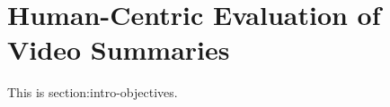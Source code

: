 \section{Human-Centric Evaluation of Video Summaries}
\label{section:method-evaluation}

This is section:intro-objectives.